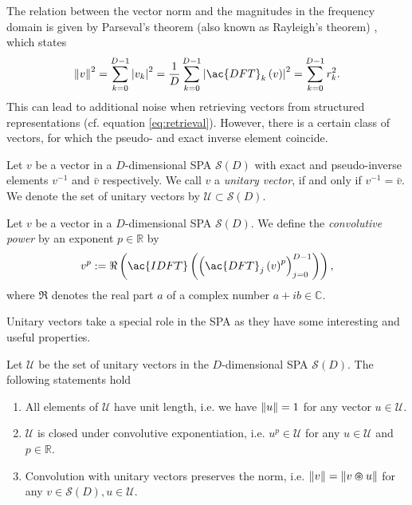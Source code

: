 The relation between the vector norm and the magnitudes in the frequency domain is given by Parseval's theorem (also known as Rayleigh's theorem) \cite[Chap. 6]{Bracewell2000}, which states
\[
\norm{v}^2 = \sum_{k=0}^{D-1} \left| v_{k} \right|^{2} = \frac{1}{D} \sum_{k=0}^{D-1} \left|\ac{DFT}_{k}\left(v\right)\right|^{2} = \sum_{k=0}^{D-1} r_{k}^{2}.
\]
This can lead to additional noise when retrieving vectors from structured representations (cf. equation \ref{eq:retrieval}).
However, there is a certain class of vectors, for which the pseudo- and exact inverse element coincide.
\begin{defn}
	\label{def:unitary_vec}
	Let $v$ be a vector in a $D$-dimensional \ac{SPA} $\mathcal{S}(D)$ with exact and pseudo-inverse elements $v^{-1}$ and $\bar{v}$ respectively.
	We call $v$ a \emph{unitary vector}, if and only if $v^{-1} = \bar{v}$.
	We denote the set of unitary vectors by $\mathcal{U} \subset \mathcal{S}(D)$.
\end{defn}
\begin{defn}
	\label{def:conv_power}
	Let $v$ be a vector in a $D$-dimensional \ac{SPA} $\mathcal{S}(D)$. We define the \emph{convolutive power} by an exponent $p \in \mathbb{R}$ by
	\[
	v^{p} := \Re\left(\ac{IDFT} \left(\left(\ac{DFT}_{j}\left(v\right)^{p}\right)_{j=0}^{D-1}\right)\right),
	\]
	where $\Re$ denotes the real part $a$ of a complex number $a + ib \in \mathbb{C}$.
\end{defn}
Unitary vectors take a special role in the \ac{SPA} as they have some interesting and useful properties.
\begin{lemma}
	\label{lemma:unitary_vec}
	Let $\mathcal{U}$ be the set of unitary vectors in the $D$-dimensional \ac{SPA} $\mathcal{S}(D)$. The following statements hold
 	\begin{enumerate}[label=\roman*]
		\item All elements of $\mathcal{U}$ have unit length, i.e. we have $\left\| u \right\| = 1$ for any vector $u \in \mathcal{U}$.
		\item $\mathcal{U}$ is closed under convolutive exponentiation, i.e. $u^{p} \in \mathcal{U}$ for any $u \in \mathcal{U}$ and $p \in \mathbb{R}$.
		\item Convolution with unitary vectors preserves the norm, i.e. $\left\| v \right\| = \left\| v \varoast u \right\|$ for any $v \in \mathcal{S}(D), u \in \mathcal{U}$.
	\end{enumerate}
\end{lemma}
